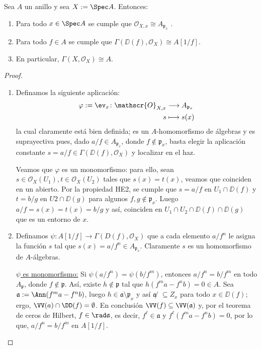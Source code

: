 \begin{thm}
	Sea $A$ un anillo y sea $X := \Spec A$. Entonces:
	\begin{enumerate}
		\item Para todo $x \in \Spec A$ se cumple que $\mathscr{O}_{X, x} \cong A_{\mathfrak{p}_x}$ .
		\item Para todo $f \in A$ se cumple que $\Gamma(\DD(f ), \mathscr{O}_X) \cong A[1/f ]$.
		\item En particular, $\Gamma(X, \mathscr{O}_X) \cong A$.
	\end{enumerate}
\end{thm}
\begin{proof}
	\begin{enumerate}
		\item Definamos la siguiente aplicación:
			\begin{align*}
				\varphi := \ev_x \colon \mathscr{O}_{X, x} &\longrightarrow A_{\mathfrak{p}_x} \\
				s &\longmapsto s(x)
			\end{align*}
			la cual claramente está bien definida; es un $A$-homomorfismo de álgebras y es suprayectiva pues, dado $a/f \in A_{\mathfrak{p}_x}$,
			donde $f \notin \mathfrak{p}_x$, basta elegir la aplicación constante $s = a/f \in \Gamma(\DD(f), \mathscr{O}_X)$ y localizar en el haz.

			Veamos que $\varphi$ es un monomorfismo: para ello, sean $s \in \mathscr{O}_X(U_1), t \in \mathscr{O}_X(U_2)$ tales que $s(x) = t(x)$,
			veamos que coinciden en un abierto.
			Por la propiedad HE2, se cumple que $s = a/f$ en $U_1 \cap \DD(f)$ y $t = b/g$ en $U2 \cap \DD(g)$ para algunos $f, g \notin \mathfrak{p}_x$.
			Luego $a/f = s(x) = t(x) = b/g$ y así, coinciden en $U_1 \cap U_2 \cap \DD(f ) \cap \DD(g)$ que es un entorno de $x$.

		\item Definamos $\psi \colon A[1/f ] \to \Gamma(D(f ), \mathscr{O}_X)$ que a cada elemento $a/f^n$ le asigna
			la función $s$ tal que $s(x) = a/f^n \in A_{\mathfrak{p}_x}$.
			Claramente $s$ es un homomorfismo de $A$-álgebras.

			\underline{$\psi$ es monomorfismo:} Si $\psi(a/f^n ) = \psi(b/f^m )$, entonces $a/f^n = b/f^m$ en todo $A_{\mathfrak{p}}$,
			donde $f \notin \mathfrak{p}$.
			Así, existe $h \notin \mathfrak{p}$ tal que $h(f^m a - f^n b) = 0 \in A$.
			Sea $\mathfrak{a} := \Ann(f^m a - f^n b)$, luego $h \in \mathfrak{a \setminus p}_x$ y así $\mathfrak{a} ̸\subseteq Z_x$ para todo
			$x \in \DD(f)$; ergo, $\VV(a) \cap \DD(f) = \emptyset$.
			En conclusión $\VV(f ) \subseteq \VV(\mathfrak{a})$ y, por el teorema de ceros de Hilbert, $f \in \rad\mathfrak{a}$, es decir,
			$f^\ell \in \mathfrak{a}$ y $f^\ell (f^m a - f^n b) = 0$, por lo que, $a/f^n = b/f^m$ en $A[1/f ]$.


\end{enumerate}
\end{proof}

